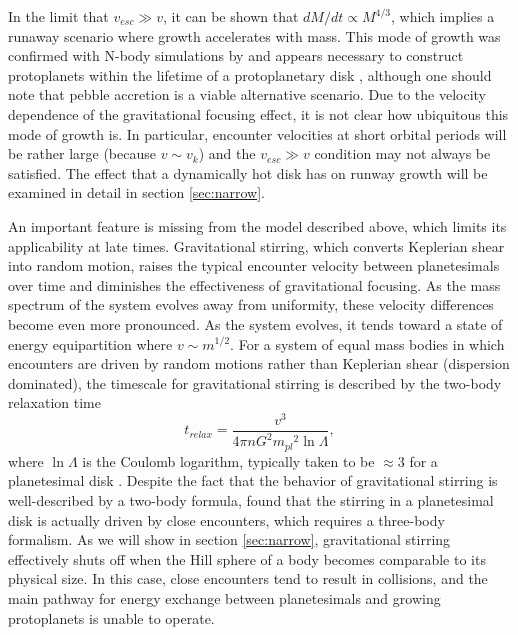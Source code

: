 \documentclass[twocolumn,linenumbers]{aastex63}
\begin{document}
In the limit that $v_{esc} \gg v$, it can be shown that $dM/dt \propto
M^{4/3}$, which implies a runaway scenario where growth
accelerates with mass. This mode of growth was confirmed with N-body
simulations by \citet{kokubo96} and appears necessary to construct
protoplanets within the lifetime of a protoplanetary disk \citep{lissauer87}, although one should note that pebble accretion \citep{lambrechts12, lambrechts14, bitsch15} is a viable alternative scenario. Due to the
velocity dependence of the gravitational focusing effect, it is not clear how ubiquitous this mode of growth is. In particular, encounter velocities at short orbital periods will be rather large (because $v \sim v_{k}$) and the $v_{esc} \gg v$ condition may not always be satisfied. The effect that a dynamically hot disk has on runway growth will be examined in detail in section \ref{sec:narrow}.

An important feature is missing from the model described above, which
limits its applicability at late times. Gravitational stirring, which converts
Keplerian shear into random motion, raises the typical encounter velocity
between planetesimals over time \citep{weidenschilling89, ida90} and diminishes the effectiveness of gravitational
focusing. As the mass spectrum of the system evolves away from uniformity, these velocity differences become even more
pronounced. As the system evolves, it tends toward a state of
energy equipartition where $v \sim m^{1/2}$. For a system of equal mass bodies in which encounters are driven by random 
motions rather than Keplerian shear (dispersion dominated), the timescale for gravitational stirring is described by the two-body 
relaxation time \citep{ida93}
\begin{equation}\label{eq:relax}
	t_{relax} = \frac{v^3}{4 \pi n G^2 {m_{pl}}^2 \ln \Lambda},
\end{equation}
where $\ln \Lambda$ is the Coulomb logarithm,
typically taken to be $\approx 3$ for a planetesimal disk \citep{ida90, stewart00}. Despite
the fact that the behavior of gravitational stirring is well-described
by a two-body formula, \citep{ida93} found that the stirring in a planetesimal disk is actually driven by close encounters, which 
requires a three-body formalism. As we will show in section \ref{sec:narrow}, gravitational stirring effectively shuts off when the 
Hill sphere of a body becomes comparable to its physical size. In this case, close encounters tend to result in collisions, and the 
main pathway for energy exchange between planetesimals and growing protoplanets is unable to operate.
\end{document}
